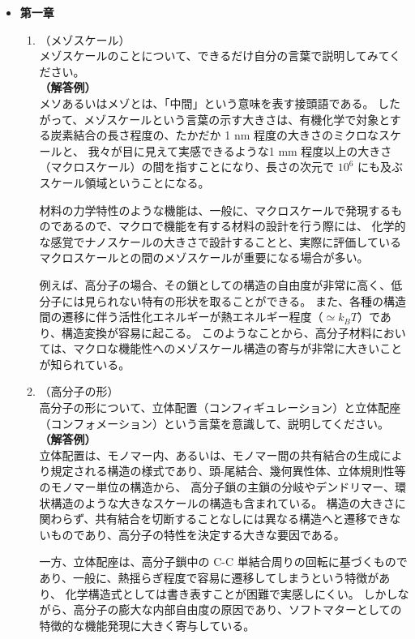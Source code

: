 \documentclass[a4paper,11pt]{ltjsarticle}
\begin{document}
\begin{itemize}
\item
{\bf 第一章}

	\begin{enumerate}
		\item
		（メゾスケール）\\
		メゾスケールのことについて、できるだけ自分の言葉で説明してみてください。\\
		{\bf（解答例）}\\
		メソあるいはメゾとは、「中間」という意味を表す接頭語である。
		したがって、メゾスケールという言葉の示す大きさは、有機化学で対象とする炭素結合の長さ程度の、たかだか 1 nm 程度の大きさのミクロなスケールと、
		我々が目に見えて実感できるような1 mm 程度以上の大きさ（マクロスケール）の間を指すことになり、長さの次元で $10^6$ にも及ぶスケール領域ということになる。

		材料の力学特性のような機能は、一般に、マクロスケールで発現するものであるので、マクロで機能を有する材料の設計を行う際には、
		化学的な感覚でナノスケールの大きさで設計することと、実際に評価しているマクロスケールとの間のメゾスケールが重要になる場合が多い。

		例えば、高分子の場合、その鎖としての構造の自由度が非常に高く、低分子には見られない特有の形状を取ることができる。
		また、各種の構造間の遷移に伴う活性化エネルギーが熱エネルギー程度（$\simeq k_B T$）であり、構造変換が容易に起こる。
		このようなことから、高分子材料においては、マクロな機能性へのメゾスケール構造の寄与が非常に大きいことが知られている。

		\item
		（高分子の形）\\
		高分子の形について、立体配置（コンフィギュレーション）と立体配座（コンフォメーション）という言葉を意識して、説明してください。\\
		{\bf（解答例）}\\
		立体配置は、モノマー内、あるいは、モノマー間の共有結合の生成により規定される構造の様式であり、頭-尾結合、幾何異性体、立体規則性等のモノマー単位の構造から、
		高分子鎖の主鎖の分岐やデンドリマー、環状構造のような大きなスケールの構造も含まれている。
		構造の大きさに関わらず、共有結合を切断することなしには異なる構造へと遷移できないものであり、高分子の特性を決定する大きな要因である。

		一方、立体配座は、高分子鎖中の C-C 単結合周りの回転に基づくものであり、一般に、熱揺らぎ程度で容易に遷移してしまうという特徴があり、
		化学構造式としては書き表すことが困難で実感しにくい。
		しかしながら、高分子の膨大な内部自由度の原因であり、ソフトマターとしての特徴的な機能発現に大きく寄与している。



\end{enumerate}
\end{itemize}
\end{document}
